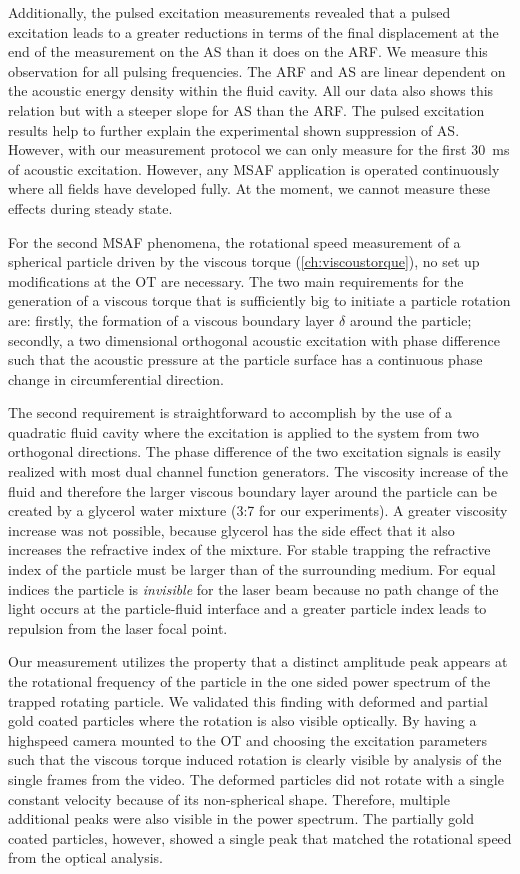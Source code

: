 Additionally, the pulsed excitation measurements revealed that a pulsed 
excitation leads to a greater reductions in terms of the final displacement at 
the end of the measurement on the AS than it does on the ARF. We measure this 
observation for all pulsing frequencies. The ARF and AS are linear dependent on 
the acoustic energy density within the fluid cavity. All our data also shows 
this relation but with a steeper slope for AS than the ARF. The pulsed 
excitation results help to further explain the experimental shown suppression 
of AS. However, with our measurement protocol we can only measure for the 
first \SI{30}{\ms} of acoustic excitation. However, any MSAF application is 
operated continuously where all fields have developed fully. At the moment, we 
cannot measure these effects during steady state.

For the second MSAF phenomena, the rotational speed measurement of a spherical 
particle driven by the viscous torque (\cref{ch:viscoustorque}), no set up 
modifications at the OT are necessary. The two main requirements for the 
generation of a viscous torque that is sufficiently big to initiate a particle 
rotation are: firstly, the formation of a viscous boundary layer $\delta$ 
around the particle; secondly, a two dimensional orthogonal acoustic excitation 
with phase difference such that the acoustic pressure at the particle surface 
has a continuous phase change in circumferential direction.

The second requirement is straightforward to accomplish by the use of a 
quadratic fluid cavity where the excitation is applied to the system from two 
orthogonal directions. The phase difference of the two excitation signals is 
easily realized with most dual channel function generators. The viscosity 
increase of the fluid and therefore the larger viscous boundary layer around 
the particle can be created by a glycerol water mixture (3:7 for our 
experiments). A greater viscosity increase was not possible, because glycerol 
has the side effect that it also increases the refractive index of the mixture. 
For stable trapping the refractive index of the particle must be larger than of 
the surrounding medium. For equal indices the particle is \emph{invisible} for 
the laser beam because no path change of the light occurs at the particle-fluid 
interface and a greater particle index leads to repulsion from the laser focal 
point.

Our measurement utilizes the property that a distinct amplitude peak appears at 
the rotational frequency of the particle in the one sided power spectrum of the 
trapped rotating particle. We validated this finding with deformed and partial 
gold coated particles where the rotation is also visible optically. By having a 
highspeed camera mounted to the OT and choosing the excitation parameters such 
that the viscous torque induced rotation is clearly visible by analysis of the 
single frames from the video. The deformed particles did not rotate with a 
single constant velocity because of its non-spherical shape. Therefore, 
multiple additional peaks were also visible in the power spectrum. The 
partially gold coated particles, however, showed a single peak that matched the 
rotational speed from the optical analysis.

